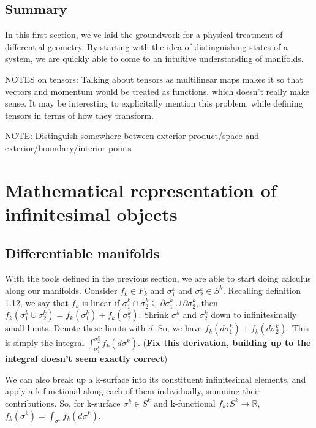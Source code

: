 \documentclass{book}
\begin{document}
\section{Summary}


In this first section, we've laid the groundwork for a physical treatment of differential geometry. By starting with the idea of distinguishing states of a system, we are quickly able to come to an intuitive understanding of manifolds. 



NOTES on tensors: Talking about tensors as multilinear maps makes it so that vectors and momentum would be treated as functions, which doesn't really make sense. It may be interesting to explicitally mention this problem, while defining tensors in terms of how they transform. 

NOTE: Distinguish somewhere between exterior product/space and exterior/boundary/interior points

\chapter{Mathematical representation of infinitesimal objects}


\section{Differentiable manifolds}



With the tools defined in the previous section, we are able to start doing calculus along our manifolds. Consider $f_k \in F_k$ and $\sigma_1^k$ and $\sigma_2^k \in S^k$. Recalling definition 1.12, we say that $f_k$ is linear if $\sigma^k_1 \cap \sigma^k_2 \subseteq \partial \sigma^k_1 \cup \partial \sigma^k_2$, then $f_k(\sigma^k_1\cup \sigma^k_2) = f_k(\sigma^k_1) + f_k(\sigma^k_2)$. Shrink $\sigma_1^k$ and $\sigma_2^k$ down to infinitesimally small limits. Denote these limits with $d$. So, we have $f_k(d\sigma^k_1) + f_k(d\sigma^k_2)$. This is simply the integral $\int_{\sigma^k_1}^{\sigma^k_2} f_k(d\sigma^k)$. (\textbf{Fix this derivation, building up to the integral doesn't seem exactly correct})

We can also break up a k-surface into its constituent infinitesimal elements, and apply a k-functional along each of them individually, summing their contributions. So, for k-surface $\sigma^k \in S^k$ and k-functional $f_k: S^k \to \mathbb{R}$, $f_k(\sigma^k) = \int_{\sigma^k}f_k(d\sigma^k)$.
\end{document}
